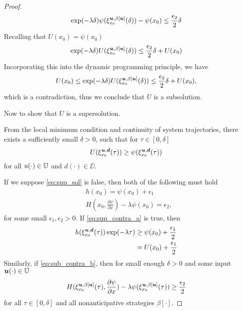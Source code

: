 \begin{for_journal}
\begin{proof}
%
\begin{equation}
\exp(-\lambda \delta)\psi(\xi_{x_0}^{\bm{u},\beta[\bm{u}]}(\delta))-\psi(x_0) \leq \frac{\epsilon_2}{2} \delta
\end{equation}
%
Recalling that $U(x_0)=\psi(x_0)$
%
\begin{equation}
\exp(-\lambda \delta)U(\xi_{x_0}^{\bm{u},\beta[\bm{u}]}(\delta)) \leq \frac{\epsilon_2}{2} \delta + U(x_0)
\end{equation}
%
Incorporating this into the dynamic programming principle, we have
%
\begin{equation}
U(x_0) \leq \exp(-\lambda \delta)U(\xi_{x_0}^{\bm{u},\beta[\bm{u}]}(\delta)) \leq \frac{\epsilon_2}{2} \delta + U(x_0),
\end{equation}
%
which is a contradiction, thus we conclude that $U$ is a subsolution.

Now to show that $U$ is a supersolution. 

From the local minimum condition and continuity of system trajectories, there exists a sufficiently small $\delta>0$, such that for $\tau \in [0, \delta]$
%
\begin{equation*}
U(\xi_{x_0}^{\bm{u}, \bm{d}}(\tau)) \geq \psi(\xi_{x_0}^{\bm{u}, \bm{d}}(\tau))
\end{equation*}
%
for all $u(\cdot) \in \mathbb{U}$ and $d(\cdot) \in \DD$.

If we suppose \eqref{eq:sup_sol} is false, then both of the following must hold 
%
\begin{subequations}
\begin{align}
&h(x_0) = \psi(x_0) + \epsilon_1 \label{eq:sup_contra_a}\\
&H(x_0,\frac{\partial \psi}{\partial x}) - \lambda \psi(x_0) = \epsilon_2 \label{eq:sup_contra_b},
\end{align} 
\end{subequations}
%
for some small $\epsilon_1, \epsilon_2 > 0$. If \eqref{eq:sup_contra_a} is true, then 
%
\begin{equation}
\begin{split}
h(\xi_{x_0}^{\bm{u}, \bm{d}}(\tau))\exp(-\lambda \tau) &\geq \psi(x_0) + \frac{\epsilon_1}{2} \\ &= U(x_0) + \frac{\epsilon_1}{2}
\end{split}
\end{equation}
%
Similarly, if \eqref{eq:sub_contra_b}, then for small enough $\delta>0$ and  some input $\bm{u}(\cdot) \in \mathbb{U}$ 
%
\begin{equation}
H(\xi_{x_0}^{\bm{u},\beta[\bm{u}]}(\tau), \frac{\partial \psi}{\partial x}) - \lambda \psi(\xi_{x_0}^{\bm{u},\beta[\bm{u}]}(\tau)) \geq \frac{\epsilon_2}{2}
\end{equation}
%
for all $\tau \in [0,\delta]$ and all nonanticipative strategies $\beta[\cdot]$. 


\end{proof}
\end{for_journal}
